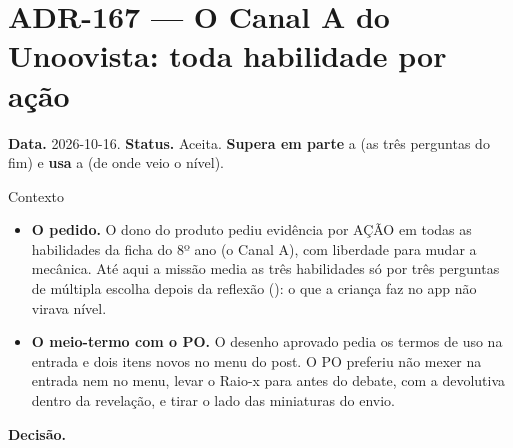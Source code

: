 \section{ADR-167 --- O Canal A do Unoovista: toda habilidade por ação}
\label{adr:exp08ef1b-canal-a}

\textbf{Data.} 2026-10-16. \textbf{Status.} Aceita. \textbf{Supera em parte} a
 (as três perguntas do fim) e \textbf{usa} a  (de
onde veio o nível).

\begin{especificacao}{Contexto}
\begin{itemize}
  \item \textbf{O pedido.} O dono do produto pediu evidência por AÇÃO em todas
    as habilidades da ficha do 8º ano (o Canal A), com liberdade para mudar a
    mecânica. Até aqui a missão media as três habilidades só por três perguntas
    de múltipla escolha depois da reflexão (): o que a criança
    faz no app não virava nível.
  \item \textbf{O meio-termo com o PO.} O desenho aprovado pedia os termos de
    uso na entrada e dois itens novos no menu do post. O PO preferiu não mexer
    na entrada nem no menu, levar o Raio-x para antes do debate, com a
    devolutiva dentro da revelação, e tirar o lado das miniaturas do envio.
\end{itemize}
\end{especificacao}

\textbf{Decisão.}

